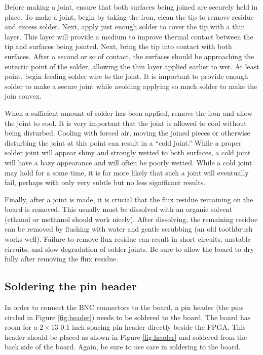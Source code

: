 Before making a joint, ensure that both surfaces being joined are
securely held in place.  To make a joint, begin by taking the iron,
clean the tip to remove residue and excess solder. Next, apply just
enough solder to cover the tip with a thin layer. This layer will
provide a medium to improve thermal contact between the tip and
surfaces being jointed. Next, bring the tip into contact with both
surfaces. After a second or so of contact, the surfaces should be
approaching the eutectic point of the solder, allowing the thin layer
applied earlier to wet. At least point, begin feeding solder wire to
the joint. It is important to provide enough solder to make a secure
joint while avoiding applying so much solder to make the join convex.

When a sufficient amount of solder has been applied, remove the iron
and allow the joint to cool. It is very important that the joint is
allowed to cool without being disturbed. Cooling with forced air,
moving the joined pieces or otherwise disturbing the joint at this
point can result in a ``cold joint.'' While a proper solder joint will
appear shiny and strongly wetted to both surfaces, a cold joint will
have a hazy appearance and will often be poorly wetted. While a cold
joint may hold for a some time, it is far more likely that such a
joint will eventually fail, perhaps with only very subtle but no less
significant results.

Finally, after a joint is made, it is crucial that the flux residue
remaining on the board is removed. This usually must be dissolved with
an organic solvent (ethanol or methanol should work nicely). After
dissolving, the remaining residue can be removed by flushing with
water and gentle scrubbing (an old toothbrush works well). Failure to
remove flux residue can result in short circuits, unstable circuits,
and slow degradation of solder joints. Be sure to allow the board to
dry fully after removing the flux residue.

\subsection{Soldering the pin header}

In order to connect the BNC connectors to the board, a pin header (the
pins circled in Figure \ref{fig:header}) needs to be soldered to the
board. The board has room for a $2 \times 13$ 0.1 inch spacing pin
header directly beside the FPGA. This header should be placed as shown
in Figure \ref{fig:header} and soldered from the back side of the
board. Again, be sure to use care in soldering to the board.

